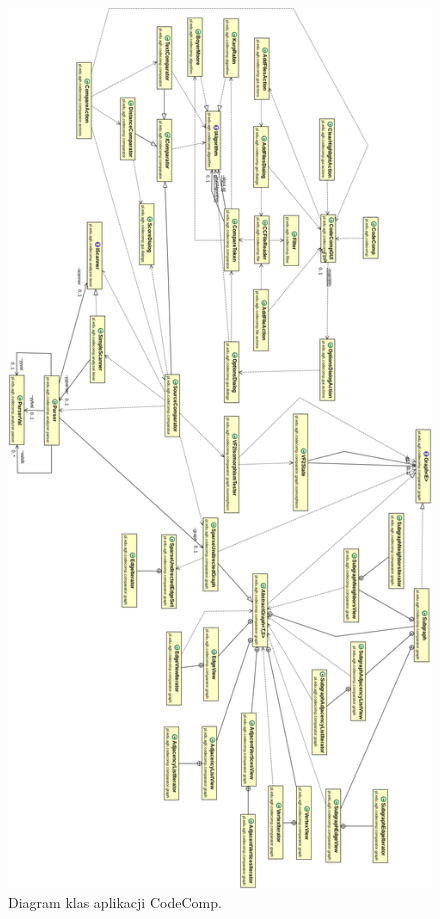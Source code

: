 \documentclass[a4paper,12pt,twoside]{article}
\begin{document}
\begin{figure}[!]
\centering
\label{fig:classdiagram}
\includegraphics[scale=0.3]{gfx/ClassDiagram2.png}
\caption{Diagram klas aplikacji CodeComp.}
\end{figure}
\end{document}
